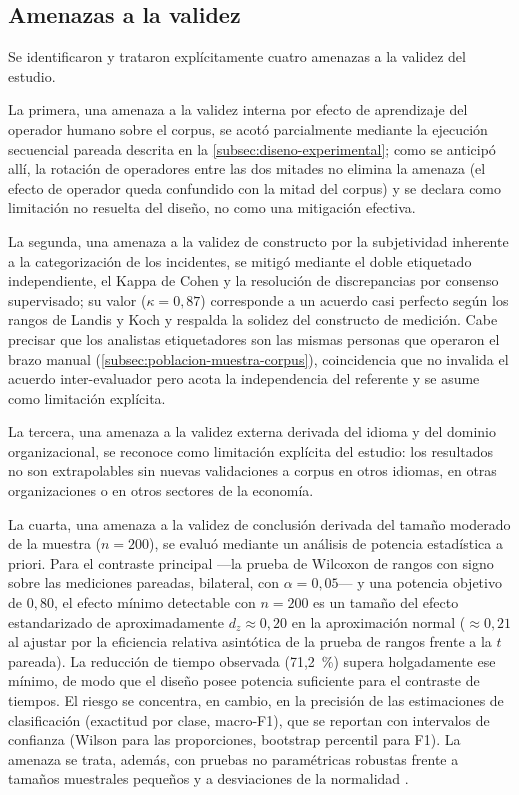 \subsection{Amenazas a la validez}\label{subsec:amenazas-validez}

Se identificaron y trataron explícitamente cuatro amenazas a la validez del estudio.

La primera, una amenaza a la validez interna por efecto de aprendizaje del operador humano sobre el corpus, se acotó parcialmente mediante la ejecución secuencial pareada descrita en la \autoref{subsec:diseno-experimental}; como se anticipó allí, la rotación de operadores entre las dos mitades no elimina la amenaza (el efecto de operador queda confundido con la mitad del corpus) y se declara como limitación no resuelta del diseño, no como una mitigación efectiva.

La segunda, una amenaza a la validez de constructo por la subjetividad inherente a la categorización de los incidentes, se mitigó mediante el doble etiquetado independiente, el Kappa de Cohen y la resolución de discrepancias por consenso supervisado; su valor (\(\kappa = 0{,}87\)) corresponde a un acuerdo casi perfecto según los rangos de Landis y Koch \parencite{Landis1977_kappa} y respalda la solidez del constructo de medición. Cabe precisar que los analistas etiquetadores son las mismas personas que operaron el brazo manual (\autoref{subsec:poblacion-muestra-corpus}), coincidencia que no invalida el acuerdo inter-evaluador pero acota la independencia del referente y se asume como limitación explícita.

La tercera, una amenaza a la validez externa derivada del idioma y del dominio organizacional, se reconoce como limitación explícita del estudio: los resultados no son extrapolables sin nuevas validaciones a corpus en otros idiomas, en otras organizaciones o en otros sectores de la economía.

La cuarta, una amenaza a la validez de conclusión derivada del tamaño moderado de la muestra (\(n = 200\)), se evaluó mediante un análisis de potencia estadística a priori. Para el contraste principal ---la prueba de Wilcoxon de rangos con signo sobre las mediciones pareadas, bilateral, con \(\alpha = 0{,}05\)--- y una potencia objetivo de \(0{,}80\), el efecto mínimo detectable con \(n = 200\) es un tamaño del efecto estandarizado de aproximadamente \(d_z \approx 0{,}20\) en la aproximación normal (\(\approx 0{,}21\) al ajustar por la eficiencia relativa asintótica de la prueba de rangos frente a la \(t\) pareada). La reducción de tiempo observada (71,2~\%) supera holgadamente ese mínimo, de modo que el diseño posee potencia suficiente para el contraste de tiempos. El riesgo se concentra, en cambio, en la precisión de las estimaciones de clasificación (exactitud por clase, macro-F1), que se reportan con intervalos de confianza (Wilson para las proporciones, bootstrap percentil para F1). La amenaza se trata, además, con pruebas no paramétricas robustas frente a tamaños muestrales pequeños y a desviaciones de la normalidad \parencite{HernandezSampieri2018_metodologia}.

